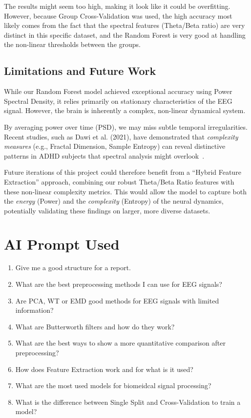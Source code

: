 \documentclass[11pt,a4paper]{article}
\begin{document}
The results might seem too high, making it look like it could be overfitting. However, because Group Cross-Validation was used, the high 
accuracy most likely comes from the fact that the spectral features (Theta/Beta ratio) are very distinct in this specific dataset, and the 
Random Forest is very good at handling the non-linear thresholds between the groups.

\subsection{Limitations and Future Work}
While our Random Forest model achieved exceptional accuracy using Power Spectral Density, it relies primarily on stationary characteristics 
of the EEG signal. However, the brain is inherently a complex, non-linear dynamical system.

By averaging power over time (PSD), we may miss subtle temporal irregularities. Recent studies, such as Dawi et al. (2021), have demonstrated 
that \textit{complexity measures} (e.g., Fractal Dimension, Sample Entropy) can reveal distinctive patterns in ADHD subjects that spectral 
analysis might overlook~\cite{dawi2021complexity}.

Future iterations of this project could therefore benefit from a ``Hybrid Feature Extraction'' approach, combining our robust Theta/Beta Ratio 
features with these non-linear complexity metrics. This would allow the model to capture both the \textit{energy} (Power) and the 
\textit{complexity} (Entropy) of the neural dynamics, potentially validating these findings on larger, more diverse datasets.

\newpage

\cleardoublepage
{}



\newpage

\section*{AI Prompt Used}
\begin{enumerate}
    \item Give me a good structure for a report.
    \item What are the best preprocessing methods I can use for EEG signals?
    \item Are PCA, WT or EMD good methods for EEG signals with limited information?
    \item What are Butterworth filters and how do they work?
    \item What are the best ways to show a more quantitative comparison after preprocessing?
    \item How does Feature Extraction work and for what is it used?
    \item What are the most used models for biomeidcal signal processing?
    \item What is the difference between Single Split and Cross-Validation to train a model?
\end{enumerate}
\end{document}
